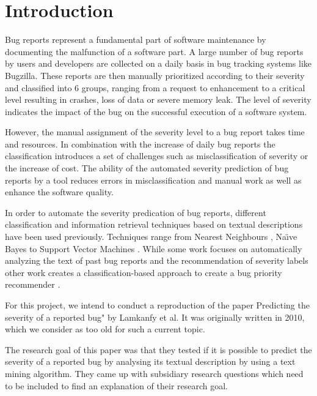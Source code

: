 \documentclass[sigconf,screen]{acmart}
\begin{document}
\section{Introduction}
Bug reports represent a fundamental part of software maintenance by documenting the malfunction of a software part. A large number of bug reports by users and developers are collected on a daily basis in bug tracking systems like Bugzilla. These reports are then manually prioritized according to their severity and classified into 6 groups, ranging from a request to enhancement to a critical level resulting in crashes, loss of data or severe memory leak. The level of severity indicates the impact of the bug on the successful execution of a software system.

However, the manual assignment of the severity level to a bug report takes time and resources. In combination with the increase of daily bug reports the classification introduces a set of challenges such as misclassification of severity or the increase of cost. The ability of the automated severity prediction of bug reports by a tool reduces errors in misclassification and manual work as well as enhance the software quality.

In order to automate the severity predication of bug reports, different classification and information retrieval techniques based on textual descriptions have been used previously. Techniques range from Nearest Neighbours \cite{TianDrone} \cite{LamkanfiMiningAlgo} \cite{ChaturvediBugSeverity}, Na{\"\i}ve Bayes \cite{LamkanfiMiningAlgo} \cite{ChaturvediBugSeverity} to Support Vector Machines \cite{KanwalOMSVM} \cite{LamkanfiMiningAlgo} \cite{ChaturvediBugSeverity}. While some work focuses on automatically analyzing the text of past bug reports and the recommendation of severity labels \cite{TianDrone} \cite{LamkanfiMiningAlgo} \cite{ChaturvediBugSeverity} other work creates a classification-based approach to create a bug priority recommender \cite{KanwalOMSVM}.

For this project, we intend to conduct a reproduction of the paper Predicting the severity of a reported bug" \cite{ourPaper} by Lamkanfy et al. It was originally written in 2010, which we consider as too old for such a current topic. 

The research goal of this paper was that they tested if it is possible to predict the severity of a reported bug by analysing its textual description by using a text mining algorithm. They came up with subsidiary research questions which need to be included to find an explanation of their research goal.
\end{document}

